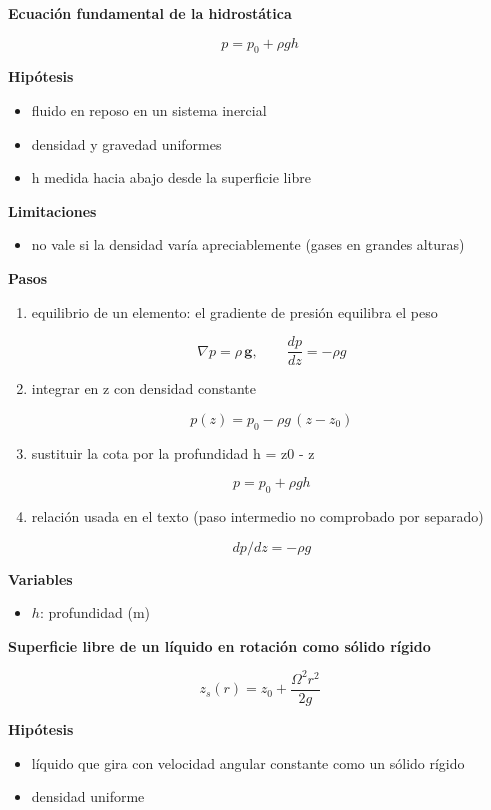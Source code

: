 \documentclass[10pt,openany]{book}
\begin{document}
\begin{tcolorbox}[title={Desarrollos del modelo}, studiumdef, breakable]

\noindent\textbf{Ecuación fundamental de la hidrostática}

\[
p = p_0 + \rho g h
\]

\noindent\textbf{Hipótesis}
\begin{itemize}
\item fluido en reposo en un sistema inercial
\item densidad y gravedad uniformes
\item h medida hacia abajo desde la superficie libre
\end{itemize}

\noindent\textbf{Limitaciones}
\begin{itemize}
\item no vale si la densidad varía apreciablemente (gases en grandes alturas)
\end{itemize}

\noindent\textbf{Pasos}
\begin{enumerate}
\item
equilibrio de un elemento: el gradiente de presión equilibra el peso

\[
\nabla p = \rho\,\mathbf{g},\qquad \frac{dp}{dz} = -\rho g
\]
\item
integrar en z con densidad constante

\[
p(z) = p_0 - \rho g\,(z - z_0)
\]
\item
sustituir la cota por la profundidad h = z0 - z

\[
p = p_0 + \rho g h
\]
\item
relación usada en el texto (paso intermedio no comprobado por separado)

\[
dp/dz = -\rho g
\]
\end{enumerate}

\noindent\textbf{Variables}
\begin{itemize}
\item $h$: profundidad ($\mathrm{m}$)
\end{itemize}



\noindent\textbf{Superficie libre de un líquido en rotación como sólido rígido}

\begin{equation}
z_s(r) = z_0 + \frac{\Omega^{2} r^{2}}{2g}
\label{eq:c05-paraboloide}
\end{equation}

\noindent\textbf{Hipótesis}
\begin{itemize}
\item líquido que gira con velocidad angular constante como un sólido rígido
\item densidad uniforme
\end{itemize}


\end{tcolorbox}
\end{document}
